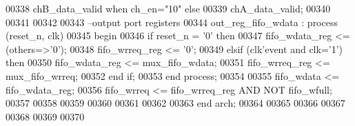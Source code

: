 \begin{DoxyCode}
00338                     \textcolor{vhdlchar}{chB_data_valid} \textcolor{keywordflow}{when} \textcolor{vhdlchar}{ch_en}\textcolor{vhdlchar}{=}\textcolor{vhdllogic}{"10"} \textcolor{keywordflow}{else}
00339                     \textcolor{vhdlchar}{chA_data_valid};
00340                      
00341             
00342                      
00343 \textcolor{keyword}{ --output port registers    }
00344 out\_reg\_fifo\_wdata : \textcolor{keywordflow}{process} (reset_n, clk)
00345 \textcolor{vhdlkeyword}{begin}
00346    \textcolor{keywordflow}{if} \textcolor{vhdlchar}{reset_n} \textcolor{vhdlchar}{=} \textcolor{vhdlchar}{'}\textcolor{vhdllogic}{}\textcolor{vhdllogic}{0}\textcolor{vhdlchar}{'} \textcolor{keywordflow}{then} 
00347       \textcolor{vhdlchar}{fifo_wdata_reg} \textcolor{vhdlchar}{<=} \textcolor{vhdlchar}{(}\textcolor{keywordflow}{others}\textcolor{vhdlchar}{=}\textcolor{vhdlchar}{>}\textcolor{vhdlchar}{'}\textcolor{vhdllogic}{}\textcolor{vhdllogic}{0}\textcolor{vhdlchar}{'}\textcolor{vhdlchar}{)};
00348       \textcolor{vhdlchar}{fifo_wrreq_reg} \textcolor{vhdlchar}{<=} \textcolor{vhdlchar}{'}\textcolor{vhdllogic}{}\textcolor{vhdllogic}{0}\textcolor{vhdlchar}{'};
00349    \textcolor{keywordflow}{elsif} \textcolor{vhdlchar}{(}\textcolor{vhdlchar}{clk}\textcolor{vhdlchar}{'}\textcolor{vhdlkeyword}{event} \textcolor{keywordflow}{and} \textcolor{vhdlchar}{clk}\textcolor{vhdlchar}{=}\textcolor{vhdlchar}{'}\textcolor{vhdllogic}{}\textcolor{vhdllogic}{1}\textcolor{vhdlchar}{'}\textcolor{vhdlchar}{)} \textcolor{keywordflow}{then} 
00350       \textcolor{vhdlchar}{fifo_wdata_reg} \textcolor{vhdlchar}{<=} \textcolor{vhdlchar}{mux_fifo_wdata};
00351       \textcolor{vhdlchar}{fifo_wrreq_reg} \textcolor{vhdlchar}{<=} \textcolor{vhdlchar}{mux_fifo_wrreq};
00352    \textcolor{keywordflow}{end} \textcolor{keywordflow}{if};
00353 \textcolor{keywordflow}{end} \textcolor{keywordflow}{process}; 
00354 
00355 \textcolor{vhdlchar}{fifo_wdata} \textcolor{vhdlchar}{<=} \textcolor{vhdlchar}{fifo_wdata_reg};
00356 \textcolor{vhdlchar}{fifo_wrreq} \textcolor{vhdlchar}{<=} \textcolor{vhdlchar}{fifo_wrreq_reg} \textcolor{keywordflow}{AND} \textcolor{keywordflow}{NOT} \textcolor{vhdlchar}{fifo_wfull};             
00357 
00358 
00359 
00360         
00361         
00362 
00363 \textcolor{keywordflow}{end} \textcolor{vhdlchar}{arch};   
00364 
00365 
00366 
00367 
00368 
00369 
00370 
\end{DoxyCode}
